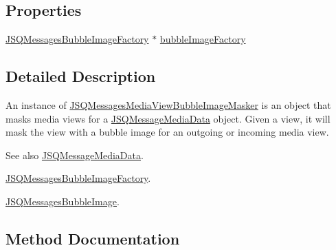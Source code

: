 \subsection*{Properties}
\begin{DoxyCompactItemize}
\item 
\hyperlink{interface_j_s_q_messages_bubble_image_factory}{J\+S\+Q\+Messages\+Bubble\+Image\+Factory} $\ast$ \hyperlink{interface_j_s_q_messages_media_view_bubble_image_masker_ae239715160deab2cc19ab9bfa7ae2db5}{bubble\+Image\+Factory}
\end{DoxyCompactItemize}


\subsection{Detailed Description}
An instance of {\ttfamily \hyperlink{interface_j_s_q_messages_media_view_bubble_image_masker}{J\+S\+Q\+Messages\+Media\+View\+Bubble\+Image\+Masker}} is an object that masks media views for a {\ttfamily \hyperlink{protocol_j_s_q_message_media_data-p}{J\+S\+Q\+Message\+Media\+Data}} object. Given a view, it will mask the view with a bubble image for an outgoing or incoming media view.

\begin{DoxySeeAlso}{See also}
\hyperlink{protocol_j_s_q_message_media_data-p}{J\+S\+Q\+Message\+Media\+Data}. 

\hyperlink{interface_j_s_q_messages_bubble_image_factory}{J\+S\+Q\+Messages\+Bubble\+Image\+Factory}. 

\hyperlink{interface_j_s_q_messages_bubble_image}{J\+S\+Q\+Messages\+Bubble\+Image}. 
\end{DoxySeeAlso}


\subsection{Method Documentation}
\hypertarget{interface_j_s_q_messages_media_view_bubble_image_masker_a20becc3892cb6f3ae13d642a5faee66a}{}
